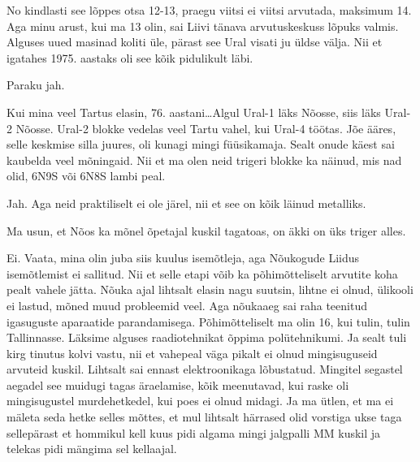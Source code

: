
No kindlasti see lõppes otsa 12-13, praegu viitsi ei viitsi arvutada, maksimum 14. Aga minu arust, kui ma 13 olin, sai Liivi tänava arvutuskeskuss lõpuks valmis. Alguses uued masinad koliti üle, pärast see Ural visati ju üldse välja. Nii et igatahes 1975. aastaks oli see kõik pidulikult läbi. 


Paraku jah. 

Kui mina veel Tartus elasin, 76. aastani\ldots Algul Ural-1 läks Nõosse, siis läks Ural-2 Nõosse. Ural-2 blokke vedelas veel Tartu vahel,  kui Ural-4 töötas. Jõe ääres, selle keskmise silla juures,  oli kunagi mingi füüsikamaja. Sealt onude käest sai kaubelda veel mõningaid. Nii et ma olen neid trigeri blokke ka näinud, mis nad olid, 6N9S või 6N8S lambi peal. 


Jah. Aga neid praktiliselt ei ole järel, nii et see on kõik läinud metalliks. 


Ma usun, et Nõos ka mõnel õpetajal kuskil tagatoas, on äkki on üks triger alles. 


Ei. Vaata, mina olin juba siis kuulus isemõtleja, aga Nõukogude Liidus isemõtlemist ei sallitud. Nii et selle etapi võib ka põhimõtteliselt arvutite koha pealt vahele jätta. Nõuka ajal lihtsalt elasin nagu suutsin, lihtne ei olnud, ülikooli ei lastud, mõned muud probleemid veel. Aga nõukaaeg sai raha teenitud igasuguste aparaatide parandamisega. Põhimõtteliselt ma olin 16, kui tulin, tulin Tallinnasse. Läksime alguses raadiotehnikat õppima polütehnikumi. Ja sealt tuli kirg tinutus kolvi vastu, nii et vahepeal väga pikalt ei olnud mingisuguseid arvuteid kuskil. Lihtsalt sai ennast elektroonikaga lõbustatud. Mingitel segastel aegadel see muidugi tagas äraelamise,  kõik meenutavad, kui raske oli mingisugustel murdehetkedel, kui poes ei olnud midagi. Ja ma ütlen, et ma ei mäleta seda hetke selles mõttes, et mul lihtsalt härrased olid vorstiga ukse taga sellepärast et hommikul kell kuus pidi algama mingi jalgpalli MM kuskil ja telekas pidi mängima sel kellaajal. 

